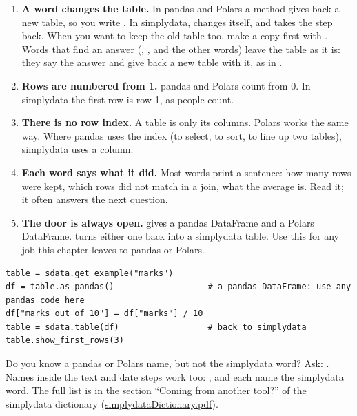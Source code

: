 \begin{enumerate}
  \item \textbf{A word changes the table.} In pandas and Polars a method gives back a new table, so you
    write . In simplydata, 
    changes  itself, and  takes the step back. When you want to keep the
    old table too, make a copy first with . Words that find an answer
    (, ,  and the other
     words) leave the table as it is: they say the answer and give back a new table with it,
    as in .
  \item \textbf{Rows are numbered from 1.} pandas  and Polars  count from 0.
    In simplydata the first row is row 1, as people count.
  \item \textbf{There is no row index.} A table is only its columns. Polars works the same way. Where
    pandas uses the index (to select, to sort, to line up two tables), simplydata uses a column.
  \item \textbf{Each word says what it did.} Most words print a sentence: how many rows were kept,
    which rows did not match in a join, what the average is. Read it; it often answers the next
    question.
  \item \textbf{The door is always open.}  gives a pandas DataFrame and
     a Polars DataFrame.  turns either one back into a
    simplydata table. Use this for any job this chapter leaves to pandas or Polars.
\end{enumerate}

\begin{lstlisting}[style=py]
table = sdata.get_example("marks")
df = table.as_pandas()                   # a pandas DataFrame: use any pandas code here
df["marks_out_of_10"] = df["marks"] / 10
table = sdata.table(df)                  # back to simplydata
table.show_first_rows(3)
\end{lstlisting}

Do you know a pandas or Polars name, but not the simplydata word? Ask: .
Names inside the text and date steps work too: ,
 and  each name the simplydata word.
The full list is in the section ``Coming from another tool?'' of the simplydata dictionary
(\href{https://github.com/bioforkgithub/simplydata/blob/main/docs/manual/simplydataDictionary.pdf}%
{simplydataDictionary.pdf}).

